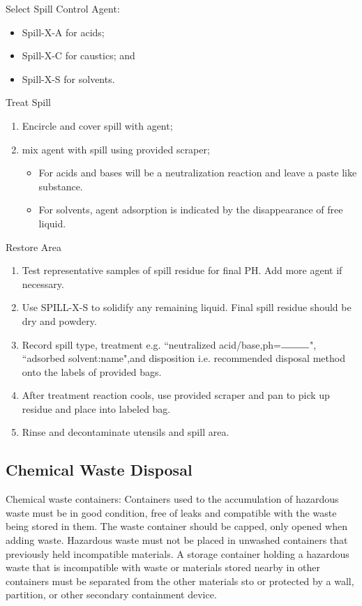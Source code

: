 \documentclass[12pt]{../SOP4_alpha}\usepackage[]{graphicx}\usepackage[]{color}
\begin{document}
\NP Select Spill Control Agent:

\begin{itemize}
  \item Spill-X-A for acids;
  \item Spill-X-C for caustics; and
  \item Spill-X-S for solvents.
\end{itemize}

\NP Treat Spill 

\begin{enumerate}
  \item Encircle and cover spill with agent;
  \item mix agent with spill using provided scraper; 
\begin{itemize}
  \item For acids and bases will be a neutralization reaction and leave a paste like substance. 
  \item For solvents, agent adsorption is indicated by the disappearance of free liquid.
\end{itemize} 
\end{enumerate}
  
\NP Restore Area
\begin{enumerate} 
  \item Test representative samples of spill residue for final PH. Add more agent if necessary. 
  \item Use SPILL-X-S to solidify any remaining liquid. Final spill residue should be dry and powdery.
  \item Record spill type, treatment e.g. ``neutralized acid/base,ph=$\rule{1cm}{0.15mm}$", ``adsorbed solvent:name",and disposition i.e. recommended disposal method onto the labels of provided bags. 
  \item After treatment reaction cools, use provided scraper and pan to pick up residue and place into labeled bag.
  \item Rinse and decontaminate utensils and spill area.
\end{enumerate}

\subsection*{Chemical Waste Disposal}

\NP Chemical waste containers: Containers used to the accumulation of hazardous waste must be in good condition, free of leaks and compatible with the waste being stored in them. The waste container should be capped, only opened when adding waste. Hazardous waste must not be placed in unwashed containers that previously held incompatible materials.  A storage container holding a hazardous waste that is incompatible with waste or materials stored nearby in other containers must be separated from the other materials  sto or protected by a wall, partition, or other secondary containment device. 
\end{document}
